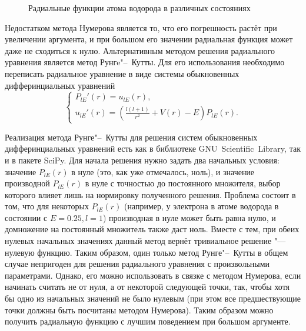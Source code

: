 \begin{figure}[ht]
    \caption{Радиальные функции атома водорода в различных состояниях}\label{fig:radial-functions}
\end{figure}

Недостатком метода Нумерова является то, что его погрешность растёт при увеличении аргумента, и при большом его значении
радиальная функция может даже не сходиться к нулю. Альтернативным методом решения радиального уравнения является метод
Рунгe"--~Кутты. Для его использования необходимо переписать радиальное уравнение в виде системы обыкновенных
дифферинциальных уравнений
\begin{equation}\label{eq:RungeKuttaSolvableSystem}
  \begin{cases}
    P_{l E}'(r) = u_{l E}(r),\\
    u_{l E}'(r) = \left( \frac{l \left(l + 1 \right)}{r^2} + V(r) - E \right) P_{l E}(r).
  \end{cases}
\end{equation}

Реализация метода Рунге"--~Кутты для решения систем обыкновенных дифферинциальных уравнений есть как в библиотеке
GNU~Scientific~Library\cite{rk-gsl}, так
и в пакете SciPy\cite{rk-scipy}. Для начала решения нужно задать два начальных условия: значение $P_{l E}(r)$ в
нуле (это, как уже отмечалось, ноль), и значение производной $P_{l E}(r)$ в нуле с точностью до постоянного
множителя, выбор которого влияет лишь на нормировку полученного решения. Проблема состоит в том, что для некоторых
$P_{l E}(r)$ (например, у электрона в атоме водорода в состоянии с $E = 0.25, l = 1$) производная в нуле может быть равна
нулю, и домножение на постоянный множитель также даст ноль. Вместе с тем, при обеих нулевых начальных значениях данный
метод вернёт тривиальное решение "---нулевую функцию. Таким образом, один только метод Рунге"--~Кутты в общем случае непригоден для
решения радиального уравнения с произвольными параметрами. Однако, его можно использовать в связке с методом Нумерова,
если начинать считать не от нуля, а от некоторой следующей точки, так, чтобы хотя бы одно из начальных значений не было
нулевым (при этом все предшествующие точки должны быть посчитаны методом Нумерова). Таким образом можно получить
радиальную функцию с лучшим поведением при большом аргументе.


